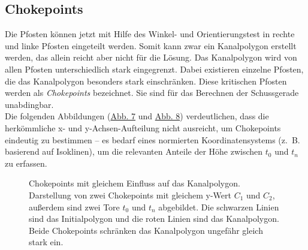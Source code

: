 \subsection{Chokepoints}
\label{sec:anfang_2}
Die Pfosten können jetzt mit Hilfe des Winkel- und Orientierungstest in rechte und linke Pfosten eingeteilt werden. Somit kann zwar ein Kanalpolygon erstellt werden, das allein reicht aber nicht für die Lösung. Das Kanalpolygon wird von allen Pfosten unterschiedlich stark eingegrenzt. Dabei existieren einzelne Pfosten, die das Kanalpolygon besonders stark einschränken. Diese kritischen Pfosten werden als \emph{Chokepoints} bezeichnet. Sie sind für das Berechnen der Schussgerade unabdingbar.\\

Die folgenden Abbildungen (\hyperref[fig:choke_equal]{Abb. 7} und \hyperref[fig:choke_diff]{Abb. 8}) verdeutlichen, dass die herkömmliche x- und y-Achsen-Aufteilung nicht ausreicht, um Chokepoints eindeutig zu bestimmen – es bedarf eines normierten Koordinatensystems (z.~B. basierend auf Isoklinen), um die relevanten Anteile der Höhe zwischen \(t_0\) und \(t_n\) zu erfassen.

\begin{figure}[h]
\centering
\label{fig:choke_equal}
    
	\caption{Chokepoints mit gleichem Einfluss auf das Kanalpolygon. Darstellung von zwei Chokepoints mit gleichem y-Wert \(C_1\) und \(C_2\), außerdem sind zwei Tore \(t_0\) und \(t_n\) abgebildet. Die schwarzen Linien sind das Initialpolygon und die roten Linien sind das Kanalpolygon. Beide Chokepoints schränken das Kanalpolygon ungefähr gleich stark ein.}
\end{figure}

